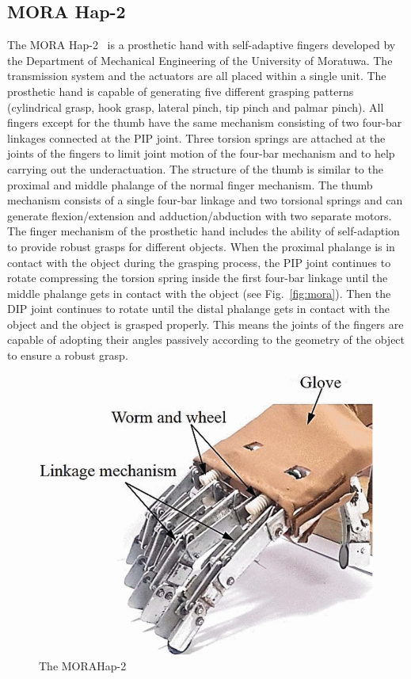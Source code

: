 \documentclass[a4paper, 10pt, conference]{ieeeconf}      %
\begin{document}
\subsection{MORA Hap-2}

The MORA Hap-2~\cite{morahap2} is a prosthetic hand with self-adaptive fingers developed by the Department of Mechanical Engineering of the University of Moratuwa. The transmission system and the actuators are all placed within a single unit. The prosthetic hand is capable of generating five different grasping patterns (cylindrical grasp, hook grasp, lateral pinch, tip pinch and palmar pinch). All fingers except for the thumb have the same mechanism consisting of two four-bar linkages connected at the PIP joint. Three torsion springs are attached at the joints of the fingers to limit joint motion of the four-bar mechanism and to help carrying out the underactuation. The structure of the thumb is similar to the proximal and middle phalange of the normal finger mechanism. The thumb mechanism consists of a single four-bar linkage and two torsional springs and can generate flexion/extension and adduction/abduction with two separate motors. The finger mechanism of the prosthetic hand includes the ability of self-adaption to provide robust grasps for different objects. When the proximal phalange is in contact with the object during the grasping process, the PIP joint continues to rotate compressing the torsion spring inside the first four-bar linkage until the middle phalange gets in contact with the object (see Fig.~\ref{fig:mora}). Then the DIP joint continues to rotate until the distal phalange gets in contact with the object and the object is grasped properly. This means the joints of the fingers are capable of adopting their angles passively according to the geometry of the object to ensure a robust grasp.

\begin{figure}[h]

	\centering
	\includegraphics[scale=0.32]{images/MORAHap-2}
	
	\caption{The MORAHap-2}
\end{figure}
\end{document}
